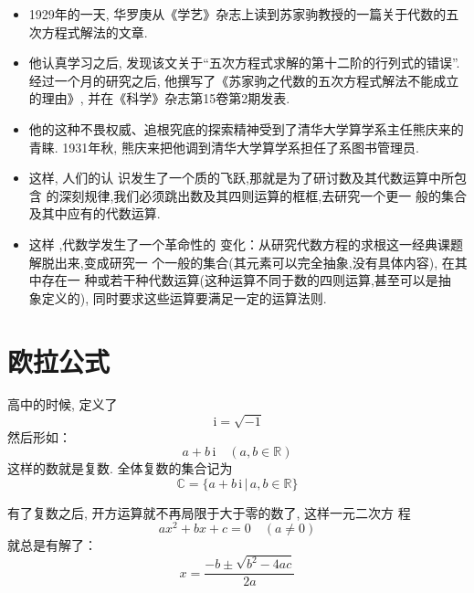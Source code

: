 \documentclass[10pt,punct]{ctexbeamer}
\def\i{\, \mathrm{i}}
\begin{document}
\begin{frame}
    \begin{itemize}
        \item 1929年的一天, 华罗庚从《学艺》杂志上读到苏家驹教授的一篇关于代数的五次方程式解法的文章.

        \item 他认真学习之后, 发现该文关于“五次方程式求解的第十二阶的行列式的错误”. 经过一个月的研究之后, 他撰写了《苏家驹之代数的五次方程式解法不能成立的理由》, 并在《科学》杂志第15卷第2期发表.

        \item 他的这种不畏权威、追根究底的探索精神受到了清华大学算学系主任熊庆来的青睐. 1931年秋, 熊庆来把他调到清华大学算学系担任了系图书管理员.
    \end{itemize}

\end{frame}


\begin{frame}
\begin{itemize}
	\item 这样, 人们的认 识发生了一个质的飞跃,那就是为了研讨数及其代数运算中所包含 的深刻规律,我们必须跳出数及其四则运算的框框,去研究一个更一 般的集合及其中应有的代数运算.

	\item  这样 ,代数学发生了一个革命性的 变化：从研究代数方程的求根这一经典课题解脱出来,变成研究一 个一般的\alert{集合}(其元素可以完全抽象,没有具体内容), 在其中存在一 种或若干种\alert{代数运算}(这种运算不同于数的四则运算,甚至可以是抽 象定义的), 同时要求这些运算要满足一定的运算法则.
\end{itemize}
\end{frame}




\section{欧拉公式}
\begin{frame}
	高中的时候, 定义了
	\[
	\i=\sqrt{-1}
	\]
	然后形如：
	\[
	a+b \i \quad(a, b \in \mathbb{R})
	\]
	这样的数就是复数.
	全体复数的集合记为
	\[
	\mathbb{C}=\{a+b \i \, | \, a, b \in \mathbb{R}\}
	\]


	有了复数之后, 开方运算就不再局限于大于零的数了, 这样一元二次方 程
	\[
	a x^{2}+b x+c=0 \quad(a \neq 0)
	\]
	就总是有解了：
	\[
	x=\frac{-b \pm \sqrt{b^{2}-4 a c}}{2 a}
	\]


\end{frame}
\end{document}
